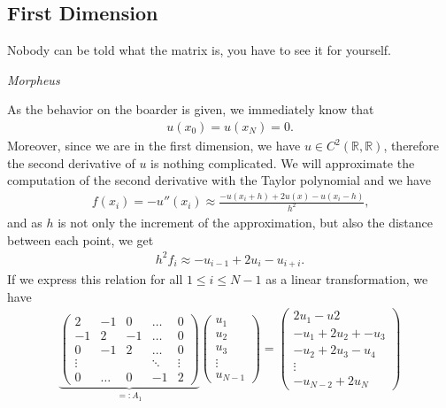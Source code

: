 \subsection{First Dimension}
\vspace*{\fill}
    \epigraph{Nobody can be told what the matrix is, you have to see it for yourself.}{\emph{Morpheus}}

As the behavior on the boarder is given, we immediately know that
\begin{align*}
    u(x_0) = u(x_N) = 0 \text{.}
\end{align*}
Moreover, since we are in the first dimension, we have \(u \in C^2(\mathbb{R}, \mathbb{R})\), therefore the second derivative of \(u\) is nothing complicated. We will approximate the computation of the second derivative with the Taylor polynomial and we have
\begin{align*}
    f(x_i) = -u''(x_i) \approx \frac{-u(x_i + h) + 2u(x) - u(x_i - h)}{h^2} \text{,}
\end{align*}
and as \(h\) is not only the increment of the approximation, but also the distance between each point, we get
\begin{align*}
    h^2 f_i \approx -u_{i - 1} + 2u_i - u_{i + i} \text{.}
\end{align*}
If we express this relation for all \(1 \leq i \leq N - 1\) as a linear transformation, we have
\begin{align*}
    \underbrace{
    \begin{pmatrix}
        2  & -1 &  0 & \dots & 0 \\
        -1 &  2 & -1 & \dots & 0 \\
        0  & -1 &  2 & \dots & 0 \\
        \vdots & & & \ddots & \vdots \\
        0 & \dots & 0 & -1 & 2
    \end{pmatrix}
    }_{=: A_1}
    \begin{pmatrix}
        u_1 \\ u_2 \\ u_3 \\ \vdots \\ u_{N-1}
    \end{pmatrix}
    =
    \begin{pmatrix}
        2u_1 - u2 \\
        -u_1 + 2u_2 + -u_3 \\
        -u_2 + 2 u_3 - u_4 \\
        \vdots \\
        -u_{N-2} + 2 u_N
    \end{pmatrix}
\end{align*}

